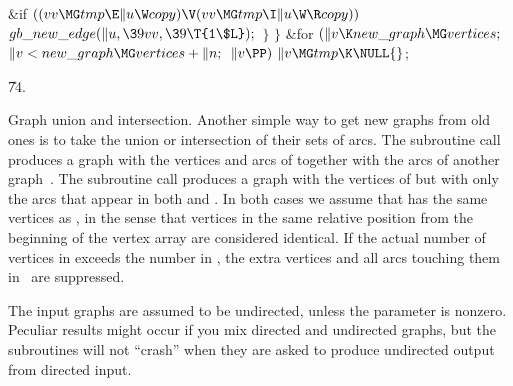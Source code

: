 \&{if} ${}((\\{vv}\MG\\{tmp}\E\|u\W\\{copy})\V(\\{vv}\MG\\{tmp}\I\|u\W\R%
\\{copy})){}$\1\5
${}\\{gb\_new\_edge}(\|u,\39\\{vv},\39\T{1\$L});{}$\2\2\6
\4${}\}{}$\2\6
\4${}\}{}$\2\6
\&{for} ${}(\|v\K\\{new\_graph}\MG\\{vertices};{}$ ${}\|v<\\{new\_graph}\MG%
\\{vertices}+\|n;{}$ ${}\|v\PP){}$\1\5
${}\|v\MG\\{tmp}\K\NULL{}$;\2\par
\U74.\fi

Graph union and intersection. Another simple way to get new graphs
from old ones is to take the union or intersection of their sets of arcs. The
subroutine call  produces a
graph
with the vertices and arcs of  together with the
arcs of another graph~. The subroutine call  produces a graph with the vertices of  but with only the
arcs that appear in both  and . In both cases we assume
that  has the same vertices as , in the sense that vertices
in the same relative position from the beginning of the vertex array
are considered identical. If the actual number of vertices in 
exceeds
the number in , the extra vertices and all arcs touching them in~ are
suppressed.

The input graphs are assumed to be undirected, unless the 
parameter is nonzero. Peculiar results might occur if you mix directed
and undirected graphs, but the subroutines will not ``crash''
when they are asked to produce undirected output from directed input.

